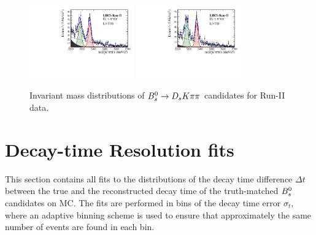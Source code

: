 \begin{figure}[h]
\includegraphics[height=!,width=0.4\textwidth]{figs/MassFit/signal_Run2_pipipi_t0.pdf}
\includegraphics[height=!,width=0.4\textwidth]{figs/MassFit/signal_Run2_pipipi_t1.pdf}

\caption{Invariant mass distributions of ${{B}^0_{s}}\rightarrow{\ensuremath{{D}_{s}}} K{\pi}{\pi}$ candidates for Run-II data.}
\label{fig:massfits_signal_Run2}
\end{figure}


\clearpage
\section{Decay-time Resolution fits}
\label{sec:DecResFits}

\setcounter{figure}{0}
\setcounter{table}{0}

\renewcommand{\thefigure}{D.\arabic{figure}}
\renewcommand{\thetable}{D.\arabic{table}}

This section contains all fits to the distributions of the decay time difference $\Delta t$ between the true and the reconstructed decay time of the truth-matched ${{B}^0_{s}}$ candidates on MC.
The fits are performed in bins of the decay time error $\sigma_{t}$, where an adaptive binning scheme is used to ensure that approximately the same number of events are found in each bin. 

